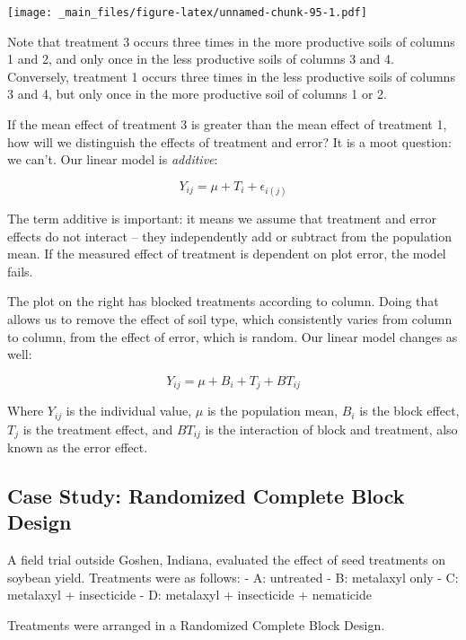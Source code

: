\documentclass[
]{book}
\begin{document}
\texttt{[image: \_main\_files/figure-latex/unnamed-chunk-95-1.pdf]}

Note that treatment 3 occurs three times in the more productive soils of columns 1 and 2, and only once in the less productive soils of columns 3 and 4. Conversely, treatment 1 occurs three times in the less productive soils of columns 3 and 4, but only once in the more productive soil of columns 1 or 2.

If the mean effect of treatment 3 is greater than the mean effect of treatment 1, how will we distinguish the effects of treatment and error? It is a moot question: we can't. Our linear model is \emph{additive}:

\[ Y_{ij}=\mu + T_i + \epsilon_{i(j)}\]

The term additive is important: it means we assume that treatment and error effects do not interact -- they independently add or subtract from the population mean. If the measured effect of treatment is dependent on plot error, the model fails.

The plot on the right has blocked treatments according to column. Doing that allows us to remove the effect of soil type, which consistently varies from column to column, from the effect of error, which is random. Our linear model changes as well:

\[ Y_{ij}=\mu + B_i + T_j + BT_{ij}\]

Where \(Y_{ij}\) is the individual value, \(\mu\) is the population mean, \(B_i\) is the block effect, \(T_j\) is the treatment effect, and \(BT_{ij}\) is the interaction of block and treatment, also known as the error effect.

\hypertarget{case-study-randomized-complete-block-design}{%
\subsection{Case Study: Randomized Complete Block Design}\label{case-study-randomized-complete-block-design}}

A field trial outside Goshen, Indiana, evaluated the effect of seed treatments on soybean yield. Treatments were as follows:
- A: untreated
- B: metalaxyl only
- C: metalaxyl + insecticide
- D: metalaxyl + insecticide + nematicide

Treatments were arranged in a Randomized Complete Block Design.
\end{document}
